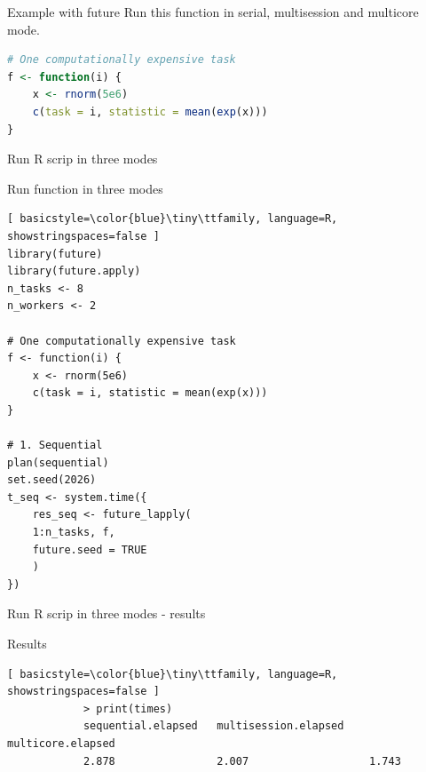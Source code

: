 \documentclass[compress,xcolor=table]{beamer}
\begin{document}
\begin{frame}[fragile]{Example with future}
Run this function in serial, multisession and multicore mode.\\
	
\begin{lstlisting}[language=R]
# One computationally expensive task
f <- function(i) {
	x <- rnorm(5e6)
	c(task = i, statistic = mean(exp(x)))
}
\end{lstlisting}
\end{frame}


\begin{frame}[fragile]{Run R scrip in three modes}
	\hfill \href{https://github.com/janezpovh/parallel-R-nov-26/blob/main/code/Rscripts_part3_future.R} {
	} 
		\vspace{-1mm} \begin{block} 
	{Run function in three modes} 
	\tiny \begin{lstlisting}[ basicstyle=\color{blue}\tiny\ttfamily, language=R, showstringspaces=false ] 
library(future)
library(future.apply)
n_tasks <- 8
n_workers <- 2

# One computationally expensive task
f <- function(i) {
	x <- rnorm(5e6)
	c(task = i, statistic = mean(exp(x)))
}

# 1. Sequential
plan(sequential)
set.seed(2026)
t_seq <- system.time({
	res_seq <- future_lapply(
	1:n_tasks, f,
	future.seed = TRUE
	)
})
	\end{lstlisting} 
\end{block} 
	
\end{frame}




\begin{frame}[fragile]{Run R scrip in three modes - results}
\begin{block}{Results} 
 \begin{lstlisting}[ basicstyle=\color{blue}\tiny\ttfamily, language=R, showstringspaces=false ] 
			> print(times)
			sequential.elapsed   multisession.elapsed    multicore.elapsed 
			2.878                2.007                   1.743 
\end{lstlisting} 
\end{block} 
	
\end{frame}
\end{document}
